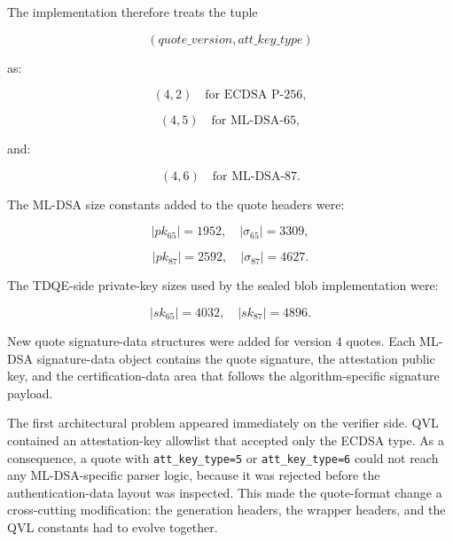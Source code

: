 The implementation therefore treats the tuple

\begin{equation}
  (quote\_version, att\_key\_type)
\end{equation}

as:

\begin{equation}
  (4, 2) \quad \text{for ECDSA P-256},
\end{equation}

\begin{equation}
  (4, 5) \quad \text{for ML-DSA-65},
\end{equation}

and:

\begin{equation}
  (4, 6) \quad \text{for ML-DSA-87}.
\end{equation}

The ML-DSA size constants added to the quote headers were:

\begin{equation}
  |pk_{65}| = 1952,\quad |\sigma_{65}| = 3309,
\end{equation}

\begin{equation}
  |pk_{87}| = 2592,\quad |\sigma_{87}| = 4627.
\end{equation}

The TDQE-side private-key sizes used by the sealed blob implementation were:

\begin{equation}
  |sk_{65}| = 4032,\quad |sk_{87}| = 4896.
\end{equation}

New quote signature-data structures were added for version 4 quotes. Each
ML-DSA signature-data object contains the quote signature, the attestation
public key, and the certification-data area that follows the algorithm-specific
signature payload.

The first architectural problem appeared immediately on the verifier side. QVL
contained an attestation-key allowlist that accepted only the ECDSA type. As a
consequence, a quote with \texttt{att\_key\_type=5} or
\texttt{att\_key\_type=6} could not reach any ML-DSA-specific parser logic,
because it was rejected before the authentication-data layout was inspected.
This made the quote-format change a cross-cutting modification: the generation
headers, the wrapper headers, and the QVL constants had to evolve together.

